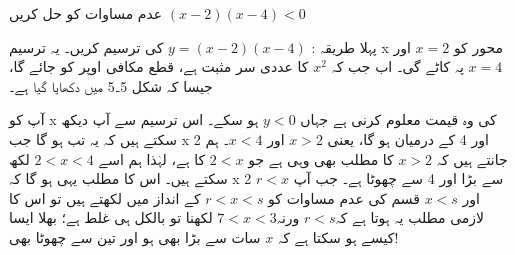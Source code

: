 

عدم مساوات کو حل کریں \((x-2)(x-4)<0\)

پہلا طریقہ : \(y=(x-2)(x-4)\) کی ترسیم کریں۔ یہ ترسیم x محور کو \(x=2\) اور \(x=4\) پہ کاٹے گی۔ اب جب کہ \(x^2\) کا عددی سر مثبت ہے، قطع مکافی اوپر کو جائے گا، جیسا کہ شکل 5۔5 میں دکھایا گیا ہے۔

آپ کو  x کی وہ قیمت معلوم کرنی ہے جہاں \(y<0\) ہو سکے۔
اس ترسیم سے آپ دیکھ سکتے ہیں کہ یہ تب ہو گا جب x  2 اور 4 کے درمیان ہو گا، یعنی \(x>2\) اور \(x<4\)۔
ہم جانتے ہیں کہ \(x>2\)  کا مطلب بھی وہی ہے جو \(2<x\) کا ہے، لہٰذا ہم اسے \(2<x<4\) لکھ سکتے ہیں۔ اس کا مطلب یہی ہو گا کہ x 2 سے بڑا اور 4 سے چھوٹا ہے۔
جب آپ \(r<x\) اور \(x<s\) قسم کی عدم مساوات کو \(r<x<s\) کے انداز میں لکھتے ہیں تو اس کا لازمی مطلب یہ ہوتا ہے کہ\(r<s\) ورنہ\(7<x<3\) لکھنا تو بالکل ہی غلط ہے؛ بھلا ایسا کیسے ہو سکتا ہے کہ  \(x\)  سات  سے بڑا بھی ہو اور تین سے چھوٹا بھی!

